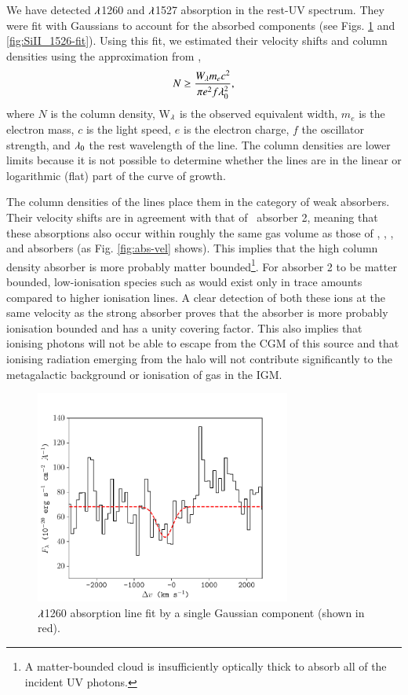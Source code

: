 We have detected  $\lam$1260 and  $\lam$1527 absorption in the rest-UV spectrum. They were fit with Gaussians to account for the absorbed components (see Figs. \ref{fig:SiII_1260-fit} and \ref{fig:SiII_1526-fit}). Using this fit, we estimated their velocity shifts and column densities using the approximation from \citet{humphrey2008b}, 
\begin{equation}
N \geq \frac { W_\lambda m_e c^2 } { \pi e^2 f \lambda_0^2 },
\end{equation}
where $N$ is the column density, W$_\lambda$ is the observed equivalent width, $m_e$ is the electron mass, $c$ is the light speed, $e$ is the electron charge, $f$ the oscillator strength, and $\lambda_0$ the rest wavelength of the line. The column densities are lower limits because it is not possible to determine whether the lines are in the linear or logarithmic (flat) part of the curve of growth.

The column densities of the  lines place them in the category of weak absorbers. Their velocity shifts are in agreement with that of \lya~absorber 2, meaning that these absorptions also occur within roughly the same gas volume as those of , , , and  absorbers (as Fig. \ref{fig:abs-vel} shows). This implies that the high column density  absorber is more probably matter bounded\footnote{A matter-bounded cloud is insufficiently optically thick to absorb all of the incident UV photons.}. For absorber 2 to be matter bounded, low-ionisation species such as  would exist only in trace amounts compared to higher ionisation lines. A clear detection of both these ions at the same velocity as the strong absorber proves that the absorber is more probably ionisation bounded and has a unity covering factor. This also implies that ionising photons will not be able to escape from the CGM of this source and that ionising radiation emerging from the halo will not contribute significantly to the metagalactic background or ionisation of gas in the IGM.

\begin{figure}
\centering 
\includegraphics[width=0.75\textwidth]{plots_chp3/SiII_1260.pdf}
\caption[ $\lam$1260 absorption line in MUSE and its best fit]{ $\lam$1260 absorption line fit by a single Gaussian component (shown in red). }
\label{fig:SiII_1260-fit}
\end{figure}

